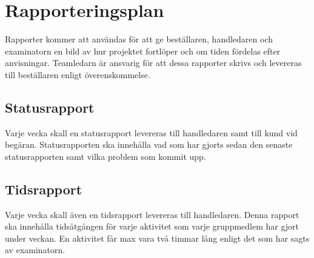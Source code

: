 \section{Rapporteringsplan}
Rapporter kommer att användas för att ge beställaren, handledaren och examinatorn en bild av hur projektet fortlöper och om tiden fördelas efter anvisningar. Teamledarn är ansvarig för att dessa rapporter skrivs och levereras till beställaren enligt överenskommelse.

\subsection{Statusrapport}
Varje vecka skall en statusrapport levereras till handledaren samt till kund vid begäran. Statusrapporten ska innehålla vad som har gjorts sedan den senaste statusrapporten samt vilka problem som kommit upp.

\subsection{Tidsrapport}
Varje vecka skall även en tidsrapport levereras till handledaren. Denna rapport ska innehålla tidsåtgången för varje aktivitet som varje gruppmedlem har gjort under veckan. En aktivitet får max vara två timmar lång enligt det som har sagts av examinatorn. 

